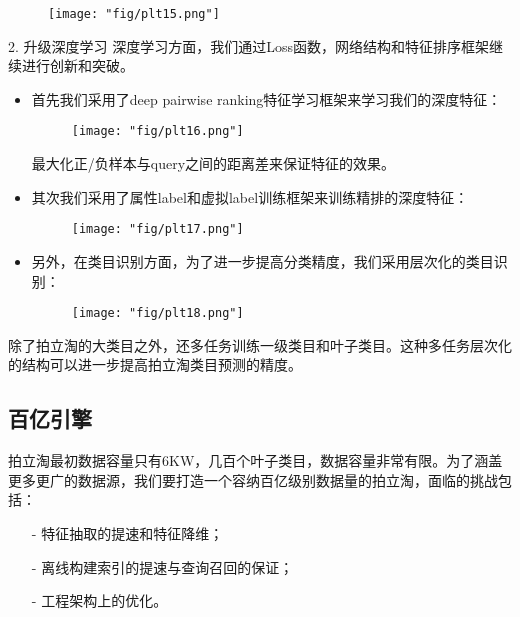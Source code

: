 \begin{figure}[!h]
	\centering
	\texttt{[image: "fig/plt15.png"]}
	\caption{}
	\label{fig:plt15}
\end{figure}

2. 升级深度学习
深度学习方面，我们通过Loss函数，网络结构和特征排序框架继续进行创新和突破。
\begin{itemize}
\item 首先我们采用了deep pairwise ranking特征学习框架来学习我们的深度特征：
\begin{figure}[!h]
	\centering
	\texttt{[image: "fig/plt16.png"]}
	\caption{}
	\label{fig:plt16}
\end{figure}
最大化正/负样本与query之间的距离差来保证特征的效果。
\item 其次我们采用了属性label和虚拟label训练框架来训练精排的深度特征：

\begin{figure}[!h]
	\centering
	\texttt{[image: "fig/plt17.png"]}
	\caption{}
	\label{fig:plt17}
\end{figure}
\item 另外，在类目识别方面，为了进一步提高分类精度，我们采用层次化的类目识别：
\begin{figure}[!h]
	\centering
	\texttt{[image: "fig/plt18.png"]}
	\caption{}
	\label{fig:plt18}
\end{figure}
\end{itemize}
除了拍立淘的大类目之外，还多任务训练一级类目和叶子类目。这种多任务层次化的结构可以进一步提高拍立淘类目预测的精度。

\subsection{百亿引擎}
拍立淘最初数据容量只有6KW，几百个叶子类目，数据容量非常有限。为了涵盖更多更广的数据源，我们要打造一个容纳百亿级别数据量的拍立淘，面临的挑战包括：
\begin{itemize}
\item[-] 特征抽取的提速和特征降维；
\item[-] 离线构建索引的提速与查询召回的保证；
\item[-]	 工程架构上的优化。
\end{itemize}

